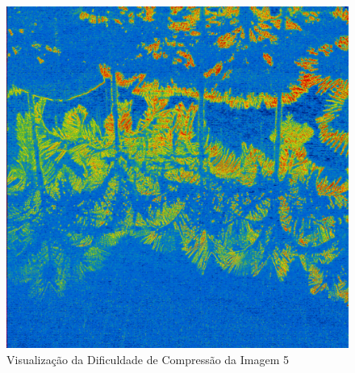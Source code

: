 \begin{figure}[H]
    \centering
    \caption{Visualização da Dificuldade de Compressão da Imagem 5}
    \label{fig:piscina_azul}
    
    \includegraphics[scale=0.1]{Documeto/1-ElementosTextuais/1-Desenvolvimento/imagens-atividade3/IMG05T.png}

    
\end{figure}

